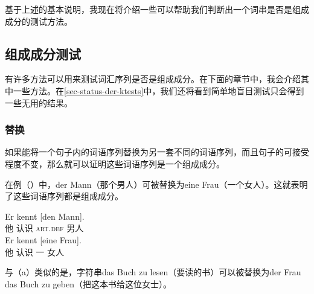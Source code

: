 基于上述的基本说明，我现在将介绍一些可以帮助我们判断出一个词串是否是组成成分的测试方法。


\subsection{组成成分测试}
有许多方法可以用来测试词汇序列是否是组成成分。在下面的章节中，我会介绍其中一些方法。在\ref{sec-status-der-ktests}中，我们还将看到简单地盲目测试只会得到一些无用的结果。

\subsubsection{替换}
如果能将一个句子内的词语序列替换为另一套不同的词语序列，而且句子的可接受程度不变，那么就可以证明这些词语序列是一个组成成分。

在例（）中，der Mann（那个男人）可被替换为eine Frau（一个女人）。这就表明了这些词语序列都是组成成分。

\eal
\ex 
\gll Er kennt [den Mann].\\
     他 认识 \spacebr{}\textsc{art}.\textsc{def} 男人\\
\ex 
\gll Er kennt [eine Frau].\\
     他 认识 \spacebr{}一 女人\\
\zl

\noindent
与（a）类似的是，字符串das Buch zu lesen（要读的书）可以被替换为der Frau das Buch zu geben（把这本书给这位女士）。

